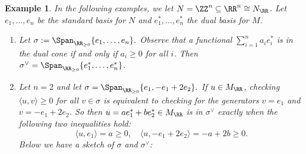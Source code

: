 \documentclass[12pt]{amsart}
\theoremstyle{plain}
\newtheorem{example}[theorem]{Example}
\begin{document}
\begin{example}
In the following examples, we let $N = \ZZ^n \subseteq \RR^n \cong N_\RR$.
Let $e_1, \ldots, e_n$ be the standard basis for $N$ and $e_1^*, \ldots, e_n^*$ the dual basis for $M$.
\begin{enumerate}
\item
Let $\sigma := \Span_{\RR_{\ge 0}}\{e_1, \ldots, e_n\}.$
Observe that a functional $\sum_{i=1}^n a_i e_i^*$ is in the dual cone if and only if $a_i \ge 0$ for all $i$.
Then $\sigma^\vee = \Span_{\RR_{\ge 0}}\{e_1^*, \ldots, e_n^*\}$.

\item
Let $n = 2$ and let $\sigma = \Span_{\RR_{\ge 0}} \{e_1, - e_1 + 2 e_2\}.$
If $u \in M_\RR$, checking $\langle u, v \rangle \ge 0$ for all $v \in \sigma$ is equivalent to checking for the generators $v = e_1$ and $v = -e_1 + 2 e_2$.
So then $u = a e_1^* + b e_2^* \in M_\RR$ is in $\sigma^\vee$ exactly when the following two inequalities hold:
$$\langle u, e_1 \rangle = a \ge 0, \quad \langle u, -e_1 + 2e_2 \rangle = -a + 2b \ge 0.$$
Below we have a sketch of $\sigma$ and $\sigma^\vee$:
\begin{figure}[H]
    \centering
\end{figure}
\end{enumerate}
\end{example}
\end{document}
